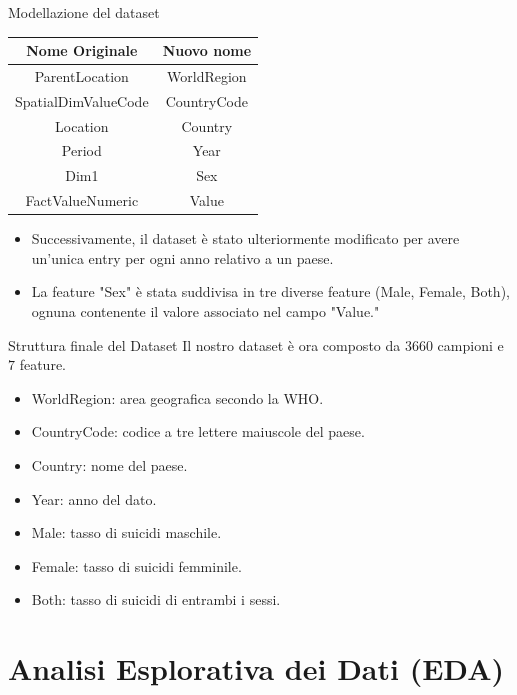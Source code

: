 \documentclass{beamer}
\begin{document}
\begin{frame}{Modellazione del dataset}
	\begin{table}
		\centering
		\begin{tabular}{|c|c|}
		  \hline
		  \textbf{Nome Originale} & \textbf{Nuovo nome} \\
		  \hline
		  ParentLocation & WorldRegion \\
		  SpatialDimValueCode & CountryCode \\
		  Location & Country \\
		  Period & Year \\
		  Dim1 & Sex \\
		  FactValueNumeric & Value \\
		  \hline
		\end{tabular}
	  \end{table}
	  \begin{itemize}
		  \item Successivamente, il dataset è stato ulteriormente modificato per avere un'unica entry per ogni anno relativo a un paese.
		  \item La feature "Sex" è stata suddivisa in tre diverse feature (Male, Female, Both), ognuna contenente il valore associato nel campo "Value."
	  \end{itemize}
\end{frame}

\begin{frame}{Struttura finale del Dataset}
	Il nostro dataset è ora composto da $3660$ campioni e $7$ feature.
	\begin{itemize}
		\item WorldRegion: area geografica secondo la WHO.
		\item CountryCode: codice a tre lettere maiuscole del paese.
		\item Country: nome del paese.
		\item Year: anno del dato.
		\item Male: tasso di suicidi maschile.
		\item Female: tasso di suicidi femminile.
		\item Both: tasso di suicidi di entrambi i sessi.
	  \end{itemize}
\end{frame}

\section{Analisi Esplorativa dei Dati (EDA)} %
\end{document}
